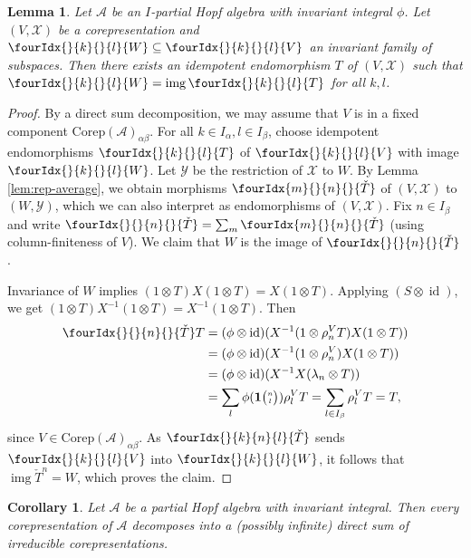 \documentclass[10pt]{article}
\DeclareMathOperator{\id}{id}
\DeclareMathOperator{\img}{img}
\newcommand{\Corep}{\mathrm{Corep}}
\newcommand{\Grt}[3]{#1{\tiny {\begin{pmatrix} #2\\#3\end{pmatrix}}}}
\newcommand{\UnitC}[2]{\Grt{\mathbf{1}}{#1}{#2}}
\newcommand{\Gr}[5]{\fourIdx{#2}{#4}{#3}{#5}{#1}}%
\newcommand{\Gru}[3]{\Gr{#1}{}{}{#2}{#3}}
\newcommand{\Grd}[3]{\Gr{#1}{#2}{#3}{}{}}
\newtheorem{Lem}[Theorem]{Lemma}
\newtheorem{Cor}[Theorem]{Corollary}
\theoremstyle{definition}
\numberwithin{equation}{section}
\begin{document}
\begin{Lem}\label{LemIm}
  Let $\mathscr{A}$ be an $I$-partial Hopf algebra with invariant integral $\phi$.
  Let $(V,\mathscr{X})$ be a corepresentation
  and $\Gru{W}{k}{l} \subseteq \Gru{V}{k}{l}$ an invariant family of
  subspaces. Then there exists an idempotent endomorphism $T$ of
  $(V,\mathscr{X})$ such that $\Gru{W}{k}{l}=\img\Gru{T}{k}{l}$ for
  all $k,l$.
\end{Lem}
\begin{proof}
  By a direct sum decomposition, we may assume that $V$ is in a fixed
  component $\Corep(\mathscr{A})_{\alpha\beta}$. For all $k\in
  I_{\alpha},l\in I_{\beta}$, choose idempotent endomorphisms
  $\Gru{T}{k}{l}$ of $\Gru{V}{k}{l}$ with image $\Gru{W}{k}{l}$.  Let
  $\mathscr{Y}$ be the restriction of $\mathscr{X}$ to $W$.  By Lemma
  \ref{lem:rep-average}, we obtain morphisms $\Grd{\check{T}}{m}{n}$
  of $(V,\mathscr{X})$ to $(W,\mathscr{Y})$, which we can also
  interpret as endomorphisms of $(V,\mathscr{X})$.  Fix $n\in
  I_{\beta}$ and write $\Grd{\check{T}}{}{n} = \sum_m
  \Grd{\check{T}}{m}{n}$ (using column-finiteness of $V$). We claim
  that $W$ is the image of $\Grd{\check{T}}{}{n}$.
  
   Invariance of $W$ implies  $(1 \otimes T)X(1
  \otimes T)=X(1\otimes T)$. Applying
 $(S \otimes \id)$, we get   $(1 \otimes T)X^{-1}(1
  \otimes T)=X^{-1}(1\otimes T)$. Then
  \begin{align*}
    \Grd{\check{T}}{}{n} T &= (\phi \otimes \id)(X^{-1}(1 \otimes
    \rho_{n}^{V}T)X(1 \otimes T))  \\ &= 
     (\phi \otimes \id)(X^{-1}(1 \otimes
    \rho_{n}^{V})X(1 \otimes T)) \\ 
    & = (\phi\otimes \id)(X^{-1}X(\lambda_n\otimes T))
    \\&
    =
  \sum_l \phi(\UnitC{n}{l}) \rho^{V}_{l}T  = \sum_{l\in I_{\beta}} \rho^V_lT = T,
  \end{align*}
 since $V\in \Corep(\mathscr{A})_{\alpha\beta}$. As $\Gr{\check{T}}{}{n}{k}{l}$ sends $\Gru{V}{k}{l}$ into $\Gru{W}{k}{l}$, it follows that $\img{\check{T}^{n}}=W$, which proves the claim.
\end{proof}

\begin{Cor}  \label{cor:rep-cosemisimple}
  Let $\mathscr{A}$ be a partial Hopf algebra with invariant integral.  Then
  every corepresentation of $\mathscr{A}$ decomposes into a (possibly infinite) direct
  sum of irreducible corepresentations.
\end{Cor} 
\end{document}
